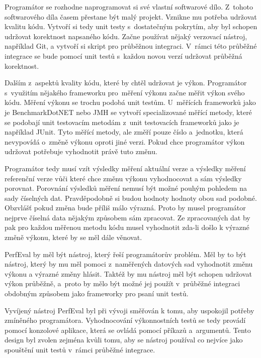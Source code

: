 Programátor se rozhodne naprogramovat si své vlastní softwarové dílo. Z~tohoto softwarového díla
časem přestane být malý projekt. Vznikne mu potřeba udržovat kvalitu kódu.
Vytvoří si tedy unit testy s~dostatečným pokrytím, aby byl schopen udržovat korektnost napsaného kódu.
Začne používat nějaký verzovací nástroj, například Git, a vytvoří si skript pro průběžnou integraci.
V~rámci této průběžné integrace se bude pomocí unit testů s~každou novou verzí udržovat průběžná korektnost.

Dalším z~aspektů kvality kódu, které by chtěl udržovat je výkon. Programátor s~využitím nějakého frameworku pro~měření výkonu začne měřit výkon svého kódu.
Měření výkonu se trochu podobá unit testům. U~měřících frameworků jako je BenchmarkDotNET nebo JMH se vytvoří specializované měřící metody,
které se podobají unit testovacím metodám z~unit testovacích frameworků jako je například JUnit.
Tyto měřící metody, ale změří pouze číslo a~jednotku, která nevypovídá o~změně výkonu oproti jiné verzi.
Pokud chce programátor výkon udržovat potřebuje vyhodnotit právě tuto změnu.

Programátor tedy musí vzít výsledky měření aktuální verze a výsledky měření referenční verze vůči které chce
změnu výkonu vyhodnocovat a sám výsledky porovnat. Porovnání výsledků měření nemusí být možné pouhým pohledem
na sady číselných dat. Pravděpodobně si budou hodnoty hodnoty obou sad podobné. Obzvlášť pokud změna bude příliš málo výrazná.
Proto by musel programátor nejprve číselná data nějakým způsobem sám zpracovat. Ze zpracovaných dat by pak pro každou měřenou metodu
kódu musel vyhodnotit zda-li došlo k výrazné změně výkonu, které by se měl dále věnovat.

PerfEval by měl být nástroj, který řeší programátorův problém. Měl by to být nástroj, který by mu měl pomoci
z~naměřených datových sad vyhodnotit změnu výkonu a výrazné změny hlásit. Taktéž by mu nástroj měl být schopen
udržovat výkon průběžně, a~proto by mělo být možné jej použít v~průběžné integraci obdobným způsobem jako frameworky
pro psaní unit testů.

Vyvíjený nástroj PerfEval byl při vývoji směřován k tomu, aby uspokojil potřeby zmíněného programátora.
Vyhodnocování výkonnostních testů se tedy provádí pomocí konzolové aplikace, která se ovládá pomocí
příkazů a~argumentů. Tento design byl zvolen zejména kvůli tomu, aby se nástroj používal co nejvíce
jako spouštění unit testů v~rámci průběžné integrace.
